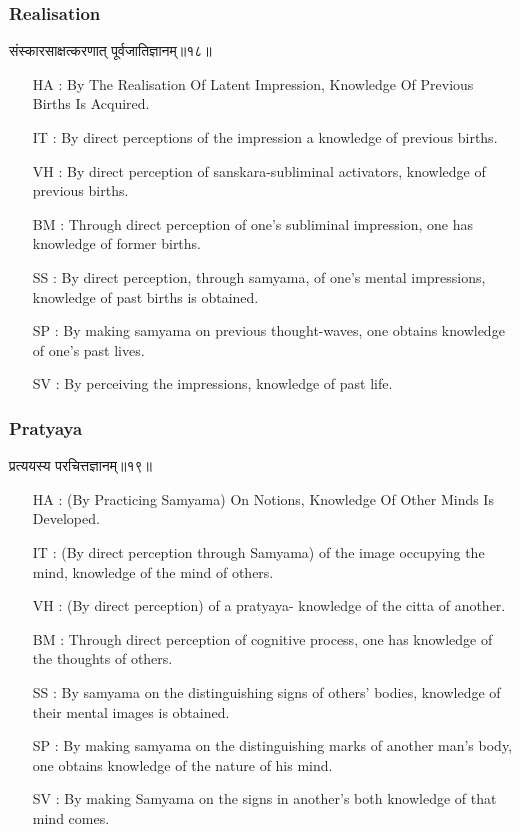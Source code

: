 \begin{frame}[fragile]\frametitle{Realisation}
\begin{sanskrit}
संस्कारसाक्षत्करणात् पूर्वजातिज्ञानम्॥१८॥
\end{sanskrit}

	\begin{itemize}
	\item [HA]: By The Realisation Of Latent Impression, Knowledge Of Previous Births Is Acquired.
	\item [IT]: By direct perceptions of the impression a knowledge of previous births.
	\item [VH]: By direct perception of sanskara-subliminal activators, knowledge of previous births.
	\item [BM]: Through direct perception of one’s subliminal impression, one has knowledge of former births.
	\item [SS]: By direct perception, through samyama, of one’s mental impressions, knowledge of past births is obtained.
	\item [SP]: By making samyama on previous thought-waves, one obtains knowledge of one’s past lives.
	\item [SV]: By perceiving the impressions, knowledge of past life. 
	\end{itemize}
\end{frame}

\begin{frame}[fragile]\frametitle{Pratyaya}
\begin{sanskrit}
प्रत्ययस्य परचित्तज्ञानम्॥१९॥
\end{sanskrit}

	\begin{itemize}
	\item [HA]: (By Practicing Samyama) On Notions, Knowledge Of Other Minds Is Developed.
	\item [IT]: (By direct perception through Samyama) of the image occupying the mind, knowledge of the mind of others.
	\item [VH]: (By direct perception) of a pratyaya- knowledge of the citta of another.
	\item [BM]: Through direct perception of cognitive process, one has knowledge of the thoughts of others.
	\item [SS]: By samyama on the distinguishing signs of others’ bodies, knowledge of their mental images is obtained.
	\item [SP]: By making samyama on the distinguishing marks of another man’s body, one obtains knowledge of the nature of his mind.
	\item [SV]: By making Samyama on the signs in another’s both knowledge of that mind comes. 
	\end{itemize}
\end{frame}


